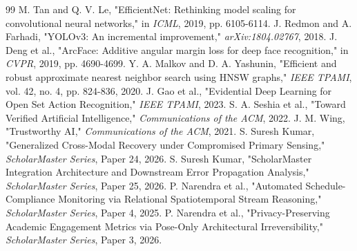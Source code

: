 \documentclass[conference]{IEEEtran}
\begin{document}
\begin{thebibliography}{99}
 M. Tan and Q. V. Le, "EfficientNet: Rethinking model scaling for convolutional neural networks," in \textit{ICML}, 2019, pp. 6105-6114.
 J. Redmon and A. Farhadi, "YOLOv3: An incremental improvement," \textit{arXiv:1804.02767}, 2018.
 J. Deng et al., "ArcFace: Additive angular margin loss for deep face recognition," in \textit{CVPR}, 2019, pp. 4690-4699.
 Y. A. Malkov and D. A. Yashunin, "Efficient and robust approximate nearest neighbor search using HNSW graphs," \textit{IEEE TPAMI}, vol. 42, no. 4, pp. 824-836, 2020.
 J. Gao et al., "Evidential Deep Learning for Open Set Action Recognition," \textit{IEEE TPAMI}, 2023.
 S. A. Seshia et al., "Toward Verified Artificial Intelligence," \textit{Communications of the ACM}, 2022.
 J. M. Wing, "Trustworthy AI," \textit{Communications of the ACM}, 2021.
 S. Suresh Kumar, "Generalized Cross-Modal Recovery under Compromised Primary Sensing," \textit{ScholarMaster Series}, Paper 24, 2026.
 S. Suresh Kumar, "ScholarMaster Integration Architecture and Downstream Error Propagation Analysis," \textit{ScholarMaster Series}, Paper 25, 2026.
 P. Narendra et al., "Automated Schedule-Compliance Monitoring via Relational Spatiotemporal Stream Reasoning," \textit{ScholarMaster Series}, Paper 4, 2025.
 P. Narendra et al., "Privacy-Preserving Academic Engagement Metrics via Pose-Only Architectural Irreversibility," \textit{ScholarMaster Series}, Paper 3, 2026.
\end{thebibliography}
\end{document}

